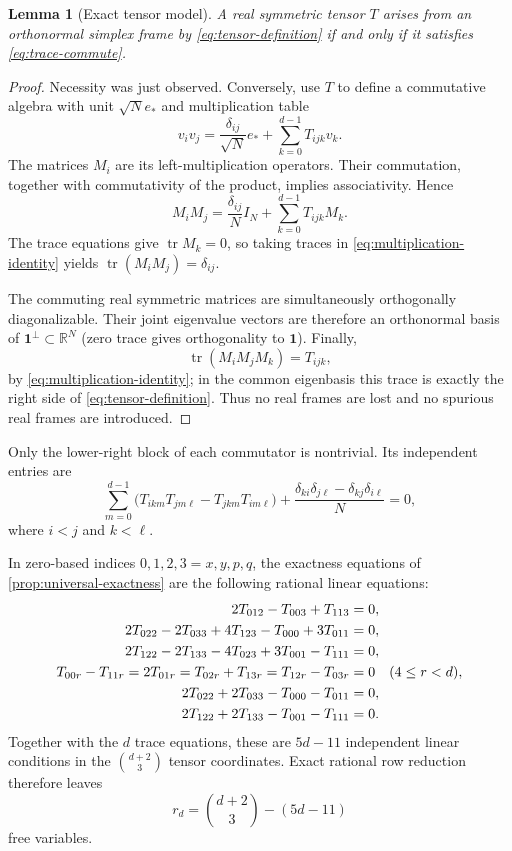 \documentclass[11pt,reqno]{amsart}
\newtheorem{lemma}[theorem]{Lemma}
\theoremstyle{remark}
\newcommand{\R}{\mathbb R}
\newcommand{\one}{\mathbf 1}
\begin{document}
\begin{lemma}[Exact tensor model]\label{lem:tensor-converse}
A real symmetric tensor $T$ arises from an orthonormal simplex frame by
\eqref{eq:tensor-definition} if and only if it satisfies
\eqref{eq:trace-commute}.
\end{lemma}

\begin{proof}
Necessity was just observed.  Conversely, use $T$ to define a commutative
algebra with unit $\sqrt N e_*$ and multiplication table
\[
 v_iv_j=\frac{\delta_{ij}}{\sqrt N}e_*+\sum_{k=0}^{d-1}T_{ijk}v_k.
\]
The matrices $M_i$ are its left-multiplication operators.  Their commutation,
together with commutativity of the product, implies associativity.  Hence
\begin{equation}\label{eq:multiplication-identity}
 M_iM_j=\frac{\delta_{ij}}N I_N+\sum_{k=0}^{d-1}T_{ijk}M_k.
\end{equation}
The trace equations give $\operatorname{tr}M_k=0$, so taking traces in
\eqref{eq:multiplication-identity} yields
$\operatorname{tr}(M_iM_j)=\delta_{ij}$.

The commuting real symmetric matrices are simultaneously orthogonally
diagonalizable.  Their joint eigenvalue vectors are therefore an orthonormal
basis of $\one^\perp\subset\R^N$ (zero trace gives orthogonality to $\one$).
Finally,
\[
 \operatorname{tr}(M_iM_jM_k)=T_{ijk},
\]
by \eqref{eq:multiplication-identity}; in the common eigenbasis this trace is
exactly the right side of \eqref{eq:tensor-definition}.  Thus no real frames
are lost and no spurious real frames are introduced.
\end{proof}

Only the lower-right block of each commutator is nontrivial.  Its independent
entries are
\begin{equation}\label{eq:commutator-polynomials}
 \sum_{m=0}^{d-1}
 \bigl(T_{ikm}T_{jm\ell}-T_{jkm}T_{im\ell}\bigr)
 +\frac{\delta_{ki}\delta_{j\ell}-\delta_{kj}\delta_{i\ell}}N=0,
\end{equation}
where $i<j$ and $k<\ell$.

In zero-based indices $0,1,2,3=x,y,p,q$, the exactness equations of
\cref{prop:universal-exactness} are the following rational linear equations:
\begin{align}
 2T_{012}-T_{003}+T_{113}&=0,\notag\\
 2T_{022}-2T_{033}+4T_{123}-T_{000}+3T_{011}&=0,\notag\\
 2T_{122}-2T_{133}-4T_{023}+3T_{001}-T_{111}&=0,\notag\\
 T_{00r}-T_{11r}=2T_{01r}=T_{02r}+T_{13r}
 =T_{12r}-T_{03r}&=0\quad(4\le r<d),\notag\\
 2T_{022}+2T_{033}-T_{000}-T_{011}&=0,\notag\\
 2T_{122}+2T_{133}-T_{001}-T_{111}&=0.
\label{eq:tensor-exactness-linear}
\end{align}
Together with the $d$ trace equations, these are $5d-11$ independent linear
conditions in the $\binom{d+2}{3}$ tensor coordinates.  Exact rational row
reduction therefore leaves
\begin{equation}\label{eq:number-free}
 r_d=\binom{d+2}{3}-(5d-11)
\end{equation}
free variables.
\end{document}
